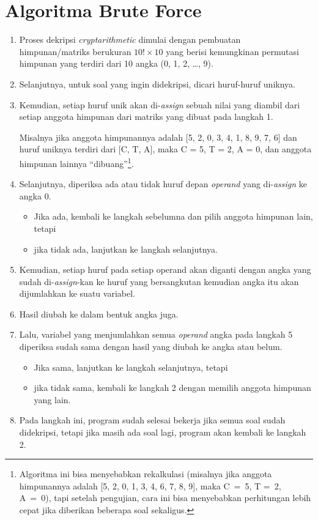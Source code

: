 \documentclass{article}
\begin{document}
\begin{titlepage}

\end{titlepage}

\section{Algoritma Brute Force}
\begin{enumerate}
  \item Proses dekripsi \textit{cryptarithmetic} dimulai dengan pembuatan
    himpunan/matriks berukuran $10! \times 10$ yang berisi kemungkinan
    permutasi himpunan yang terdiri dari 10 angka (0, 1, 2, \ldots, 9).
  \item Selanjutnya, untuk soal yang ingin didekripsi, dicari huruf-huruf
    uniknya.
  \item Kemudian, setiap huruf unik akan di-\textit{assign} sebuah nilai yang
    diambil dari setiap anggota himpunan dari matriks yang dibuat pada langkah
    1.

    Misalnya jika anggota himpunannya adalah [5, 2, 0, 3, 4, 1, 8, 9,
    7, 6] dan huruf uniknya terdiri dari [C, T, A], maka C = 5, T = 2, A = 0,
    dan anggota himpunan lainnya ``dibuang''\footnote{Algoritma ini bisa
    menyebabkan rekalkulasi (misalnya jika anggota himpunannya adalah [5, 2, 0,
    1, 3, 4, 6, 7, 8, 9], maka C~=~5, T =~2, A~=~0), tapi setelah pengujian,
    cara ini bisa menyebabkan perhitungan lebih cepat jika diberikan beberapa
    soal sekaligus.}.
  \item Selanjutnya, diperiksa ada atau tidak huruf depan \textit{operand} yang
    di-\textit{assign} ke angka 0.
    \begin{itemize}
      \item Jika ada, kembali ke langkah sebelumna dan pilih anggota himpunan
        lain, tetapi
      \item jika tidak ada, lanjutkan ke langkah selanjutnya.
    \end{itemize}
  \item Kemudian, setiap huruf pada setiap operand akan diganti dengan angka
    yang sudah di-\textit{assign}-kan ke huruf yang bersangkutan kemudian angka
    itu akan dijumlahkan ke suatu variabel.
  \item Hasil diubah ke dalam bentuk angka juga.
  \item Lalu, variabel yang menjumlahkan semua \textit{operand} angka
    pada langkah 5 diperiksa sudah sama dengan hasil yang diubah ke angka atau
    belum.
    \begin{itemize}
      \item Jika sama, lanjutkan ke langkah selanjutnya, tetapi
      \item jika tidak sama, kembali ke langkah 2 dengan memilih anggota
        himpunan yang lain.
    \end{itemize}
  \item Pada langkah ini, program sudah selesai bekerja jika semua soal sudah
    didekripsi, tetapi jika masih ada soal lagi, program akan kembali ke
    langkah 2.
\end{enumerate}
\end{document}
